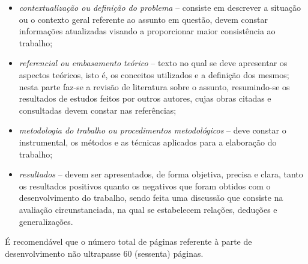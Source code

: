 \begin{itemize}
   \item \textit{contextualização ou definição do problema} -- consiste em
   descrever a situação ou o contexto geral referente ao assunto em questão,
   devem constar informações atualizadas visando a proporcionar maior
   consistência ao trabalho;
   \item \textit{referencial ou embasamento teórico} -- texto no qual se deve
   apresentar os aspectos teóricos, isto é, os conceitos utilizados e a
   definição dos mesmos; nesta parte faz-se a revisão de literatura sobre o
   assunto, resumindo-se os resultados de estudos feitos por outros autores,
   cujas obras citadas e consultadas devem constar nas referências;
   \item \textit{metodologia do trabalho ou procedimentos metodológicos} -- deve
   constar o instrumental, os métodos e as técnicas aplicados para a elaboração
   do trabalho;
   \item \textit{resultados} -- devem ser apresentados, de forma objetiva,
   precisa e clara, tanto os resultados positivos quanto os negativos que foram
   obtidos com o desenvolvimento do trabalho, sendo feita uma discussão que
   consiste na avaliação circunstanciada, na qual se estabelecem relações,
   deduções e generalizações.
\end{itemize}

É recomendável que o número total de páginas referente à parte de
 desenvolvimento não ultrapasse 60 (sessenta) páginas.